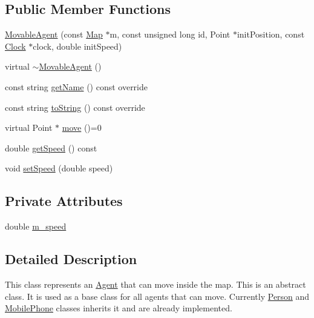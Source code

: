 \subsection*{Public Member Functions}
\begin{DoxyCompactItemize}
\item 
\mbox{\hyperlink{class_movable_agent_ad76b14a044181a57ade71f1267a2ccbd}{Movable\+Agent}} (const \mbox{\hyperlink{class_map}{Map}} $\ast$m, const unsigned long id, Point $\ast$init\+Position, const \mbox{\hyperlink{class_clock}{Clock}} $\ast$clock, double init\+Speed)
\item 
virtual \mbox{\hyperlink{class_movable_agent_a20eb9ddcc953137e63e035837918206c}{$\sim$\+Movable\+Agent}} ()
\item 
const string \mbox{\hyperlink{class_movable_agent_abcc1218876c39c996f2cb1eba2b96379}{get\+Name}} () const override
\item 
const string \mbox{\hyperlink{class_movable_agent_a1dee2a6bf93f01006fadfb6fba6c9a59}{to\+String}} () const override
\item 
virtual Point $\ast$ \mbox{\hyperlink{class_movable_agent_a88b617f0e78c817634e5b587da045ab0}{move}} ()=0
\item 
double \mbox{\hyperlink{class_movable_agent_a12fcdaee60f5bb29f15fe113a7dacaac}{get\+Speed}} () const
\item 
void \mbox{\hyperlink{class_movable_agent_ae2ef452e81789a4370e7dee32a9cc67e}{set\+Speed}} (double speed)
\end{DoxyCompactItemize}
\subsection*{Private Attributes}
\begin{DoxyCompactItemize}
\item 
double \mbox{\hyperlink{class_movable_agent_ac725b42e7b968740a59c3e1033d69ac5}{m\+\_\+speed}}
\end{DoxyCompactItemize}


\subsection{Detailed Description}
This class represents an \mbox{\hyperlink{class_agent}{Agent}} that can move inside the map. This is an abstract class. It is used as a base class for all agents that can move. Currently \mbox{\hyperlink{class_person}{Person}} and \mbox{\hyperlink{class_mobile_phone}{Mobile\+Phone}} classes inherits it and are already implemented.

